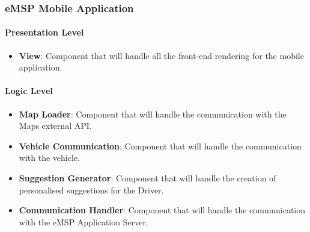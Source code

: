 \subsubsection{eMSP Mobile Application}
\label{applicationView}
\paragraph{Presentation Level}
\begin{itemize}
    \item \textbf{View}: Component that will handle all the front-end rendering for the mobile application.
\end{itemize}
\paragraph{Logic Level}
\begin{itemize}
    \item \textbf{Map Loader}: Component that will handle the communication with the Maps external API.
    \item \textbf{Vehicle Communication}: Component that will handle the communication with the vehicle.
    \item \textbf{Suggestion Generator}: Component that will handle the creation of personalised suggestions for the Driver.
    \item \textbf{Communication Handler}: Component that will handle the communication with the eMSP Application Server.
\end{itemize}
